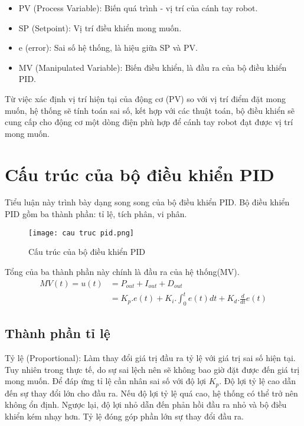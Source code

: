 \begin{itemize}
	
	\item PV (Process Variable): Biến quá trình - vị trí của cánh tay robot.
	\item SP (Setpoint): Vị trí điều khiển mong muốn. 
	\item e (error): Sai số hệ thống, là hiệu giữa SP và PV.
	\item MV (Manipulated Variable): Biến điều khiển, là đầu ra của bộ điều khiển PID.
	
\end{itemize}

Từ việc xác định vị trí hiện tại của động cơ (PV) so với vị trí điểm đặt mong muốn, hệ thống sẽ tính toán sai số, kết hợp với các thuật toán, bộ điều khiển sẽ cung cấp cho động cơ một dòng điện phù hợp để cánh tay robot đạt được vị trí mong muốn.

\section{Cấu trúc của bộ điều khiển PID}
Tiểu luận này trình bày dạng song song của bộ điều khiển PID. Bộ điều khiển PID gồm ba thành phần: tỉ lệ, tích phân, vi phân.

\begin{figure}[h!]
	\centering
	\texttt{[image: cau truc pid.png]}
	\caption[Cấu trúc của bộ điều khiển PID]{Cấu trúc của bộ điều khiển PID}
	\label{fig:cautrucPID}
\end{figure}

Tổng của ba thành phần này chính là đầu ra của hệ thống(MV).
\begin{align}
 	MV(t) = u(t) &= P_{out} + I_{out} + D_{out}   \\
		&= K_p.e(t) + K_i.\int_{0}^{t}e(t)dt + K_d.\frac{d}{dt}e(t)
\end{align}
    
\subsection{Thành phần tỉ lệ}

Tỷ lệ (Proportional): Làm thay đổi giá trị đầu ra tỷ lệ với giá trị sai số hiện tại. Tuy nhiên trong thực tế, do sự sai lệch nên sẽ không bao giờ đặt được đến giá trị mong muốn. Để đáp ứng tỉ lệ cần nhân sai số với độ lợi $K_p$. Độ lợi tỷ lệ cao dẫn đến sự thay đổi lớn cho đầu ra. Nếu độ lợi tỷ lệ quá cao, hệ thống có thể trở nên không ổn định. Ngược lại, độ lợi nhỏ dẫn đến phản hồi đầu ra nhỏ và bộ điều khiển kém nhạy hơn. Tỷ lệ đóng góp phần lớn sự thay đổi đầu ra.

